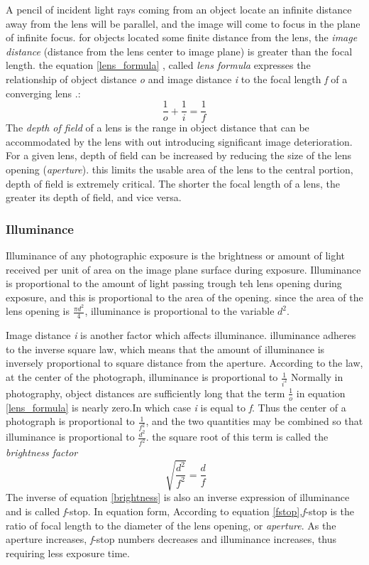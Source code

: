 A pencil of incident light rays coming from an object locate an infinite distance away from the lens will be parallel, and the image will come to focus in the plane of infinite focus. for objects located some finite distance from the lens, the \textit{image distance} (distance from the lens center to image plane) is greater than the focal length. the equation \ref{lens_formula} , called \textit{lens formula} expresses the relationship of object distance  \textit{o} and image distance \textit{i} to the focal length \textit{f} of a converging lens \cite{elements_photogrammetry}.:
\begin{equation}
\frac{1}{o}+\frac{1}{i}=\frac{1}{f}
\label{lens_formula}
\end{equation}
The \textit{depth of field} of a lens is the range in object distance that can be accommodated by the lens with out introducing significant image deterioration. For a given lens, depth of field can be increased by reducing the size of the lens opening (\textit{aperture}). this limits the usable area of the lens to the central portion, depth of field is extremely critical. The shorter the focal length of a lens, the greater its depth of field, and vice versa.\cite{elements_photogrammetry}
\subsubsection{Illuminance}
Illuminance of any photographic exposure is the brightness or amount of light received per unit of area on the image plane surface during exposure.
Illuminance is proportional to the amount of light passing trough teh lens opening during exposure, and this is proportional to the area of the opening. since the area of the lens opening is $\frac{\pi d^2}{4}$, illuminance is proportional to the variable $d^2$.\cite{elements_photogrammetry}

Image distance \textit{i} is another factor which affects illuminance. illuminance adheres to the inverse square law, which means that the amount of illuminance is inversely proportional to square distance from the aperture. According to the law, at the center of the photograph, illuminance is proportional to $\frac{1}{i^2}$ Normally in photography, object distances are sufficiently long that the term $\frac{1}{o}$ in equation \ref{lens_formula} is nearly zero.In which case \textit{i} is equal to \textit{f}. Thus the center of a photograph is proportional to $\frac{1}{f^2}$, and the two quantities may be combined so that illuminance is proportional to $\frac{d^2}{f^2}$. the square root of this term is called the \textit{brightness factor}\cite{elements_photogrammetry}
\begin{equation}
\sqrt[]{\frac{d^2}{f^2}}=\frac{d}{f}
\label{brightness}
\end{equation}
The inverse of equation \ref{brightness} is also an inverse expression of illuminance and is called \textit{f}-stop. In equation form, According to equation \ref{fstop},\textit{f}-stop is the ratio of focal length to the diameter of the lens opening, or \textit{aperture}. As the aperture increases, \textit{f}-stop numbers decreases and illuminance increases, thus requiring less exposure time.\cite{elements_photogrammetry}


